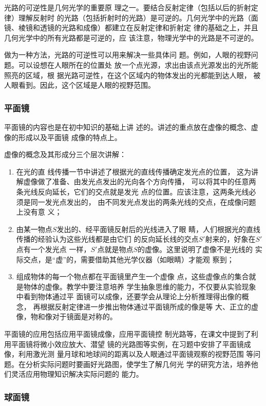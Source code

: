 光路的可逆性是几何光学的重要原
理之一。要结合反射定律（包括以后的折射定律）理解反射时
的光路（包括折射时的光路）是可逆的。几何光学中的光路（面
镜、棱镜和透镜的光路和成像）都建立在反射定律和折射定
律的基础之上，并且几何光学中的所有光路都是可逆的，应
该注意，物理光学中的光路是不可逆的。

做为一种方法，光路的可逆性可以用来解决一些具体问
题。例如，人眼的视野问题。可以设想在人眼所在的位置处
放一个点光源，求出由该点光源发出的光所能照亮的区域，根
据光路可逆性，在这个区域内的物体发出的光都能到达人眼，
被人眼看到。因此，这个区域是人眼的视野范围。

\subsubsection{平面镜}

平面镜的内容也是在初中知识的基础上讲
述的。讲述的重点放在虚像的概念、虚像的形成以及平面镜
成像的特点上。

虚像的概念及其形成分三个层次讲解：
\begin{enumerate}
\item 在光的直
线传播一节中讲述了根据光的直线传播确定发光点的位置，
这为讲解虚像做了准备、由发光点发出的光向各个方向传播，
可以将其中的任意两条光线反向延长，它们的交点就是发光
点的位置。应该注意，这两条光线必须是同一发光点发出的，
由不同发光点发出的两条光线的交点，在成像问题上没有意
义；
\item 由某一物点$S$发出的、经平面镜反射后的光线进入了眼
睛，人们根据光的直线传播的经验认为这些光线都是由它们
的反向延长线的交点$S'$射来的，好象在$S'$点有一个发光点
一样，$S'$点就是物点$S$的虚像。这里说明了虚像不是光线的
实际交点，是“虚”的，需要借助其他光学仪器（如眼睛）才能观
察到；
\item 组成物体的每一个物点都在平面镜里产生一个虚像
点，这些虚像点的集合就是物体的虚像。教学中要注意培养
学生抽象思维的能力，不仅要从实验现象中看到物体通过平
面镜可以成像，还要学会从理论上分析推理得出像的概念，
再根据反射定律进一步推出物体通过平面镜所成的像是等
大、正立的虚像，物和像对于镜面是对称的。
\end{enumerate}

平面镜的应用包括应用平面镜成像，应用平面镜控
制光路等，在课文中提到了利用平面镜将微小效应放大、潜望
镜的光路图等实例，在习题中安排了平面镜成像，利用激光测
量月球和地球间的距离以及人眼通过平面镜观察的视野范围
等问题。在分析实际问题时要画好光路图，使学生了解几何光
学的研究方法，培养他们灵活应用物理知识解决实际问题的
能力。

\subsubsection{球面镜}

